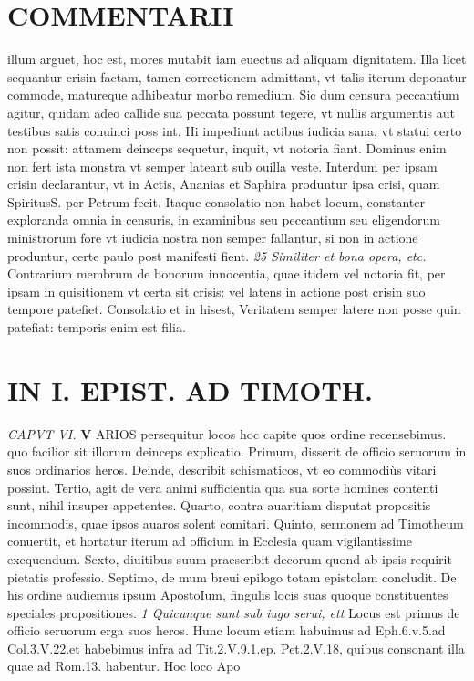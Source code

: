 \documentclass{article}
\begin{document}
\begin{pages}
\section*{COMMENTARII }
\marginpar{[ p.142 ]}\pstart illum arguet, hoc est, mores mutabit iam euectus ad aliquam dignitatem. Illa licet sequantur crisin factam, tamen correctionem admittant, vt talis iterum deponatur commode, matureque adhibeatur morbo remedium. Sic dum censura peccantium agitur, quidam adeo callide sua peccata possunt tegere, vt nullis argumentis aut testibus satis conuinci poss int. Hi impediunt actibus iudicia sana, vt statui certo non possit: attamem deinceps sequetur, inquit, vt notoria fiant. Dominus enim non fert ista monstra vt semper lateant sub ouilla veste. Interdum per ipsam crisin declarantur, vt in Actis, Ananias et Saphira produntur ipsa crisi, quam SpiritusS. per Petrum fecit. Itaque consolatio non habet locum, constanter exploranda omnia in censuris, in examinibus seu peccantium seu eligendorum ministrorum fore vt iudicia nostra non semper fallantur, si non in actione produntur, certe paulo post manifesti fient.  \pend
\textit{25 Similiter et bona opera, etc. }\pstart Contrarium membrum de bonorum innocentia, quae itidem vel notoria fit, per ipsam in quisitionem vt certa sit crisis: vel latens in actione post crisin suo tempore patefiet. Consolatio et in hisest, Veritatem semper latere non posse quin patefiat: temporis enim est filia.  \pend
\section*{IN I. EPIST. AD TIMOTH. }
\marginpar{[ p.143 ]}
\textit{CAPVT VI. }
\textbf{V }\pstart ARIOS persequitur locos hoc capite quos ordine recensebimus. quo facilior sit illorum deinceps explicatio. Primum, disserit de officio seruorum in suos ordinarios heros. Deinde, describit schismaticos, vt eo commodiùs vitari possint. Tertio, agit de vera animi sufficientia qua sua sorte homines contenti sunt, nihil insuper appetentes. Quarto, contra auaritiam disputat propositis incommodis, quae ipsos auaros solent comitari. Quinto, sermonem ad Timotheum conuertit, et hortatur iterum ad officium in Ecclesia quam vigilantissime exequendum. Sexto, diuitibus suum praescribit decorum quond ab ipsis requirit pietatis professio. Septimo, de mum breui epilogo totam epistolam concludit. De his ordine audiemus ipsum ApostoIum, fingulis locis suas quoque constituentes speciales propositiones.  \pend
\textit{1 Quicunque sunt sub iugo serui, ett }\pstart Locus est primus de officio seruorum erga suos heros. Hunc locum etiam habuimus ad Eph.6.v.5.ad Col.3.V.22.et habebimus infra ad Tit.2.V.9.1.ep. Pet.2.V.18, quibus consonant illa quae ad Rom.13. habentur. Hoc loco Apo\pend

\end{pages}
\end{document}
